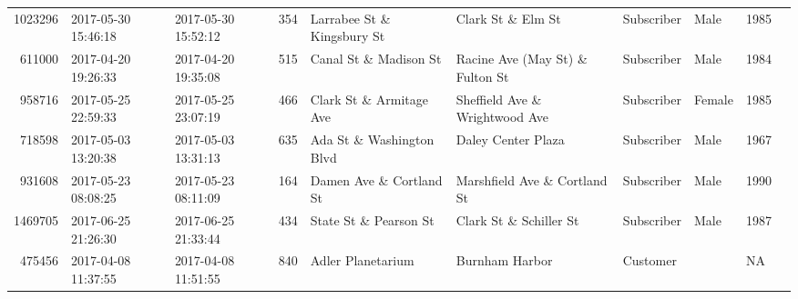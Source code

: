 \documentclass[11pt]{article}
\begin{document}
\begin{description}
\begin{tabular}{r|lllllllll}
	 1023296                                & 2017-05-30 15:46:18                    & 2017-05-30 15:52:12                    &  354                                   & Larrabee St \& Kingsbury St           & Clark St \& Elm St                    & Subscriber                             & Male                                   & 1985                                  \\
	  611000                                & 2017-04-20 19:26:33                    & 2017-04-20 19:35:08                    &  515                                   & Canal St \& Madison St                & Racine Ave (May St) \& Fulton St      & Subscriber                             & Male                                   & 1984                                  \\
	  958716                                & 2017-05-25 22:59:33                    & 2017-05-25 23:07:19                    &  466                                   & Clark St \& Armitage Ave              & Sheffield Ave \& Wrightwood Ave       & Subscriber                             & Female                                 & 1985                                  \\
	  718598                              & 2017-05-03 13:20:38                  & 2017-05-03 13:31:13                  &  635                                 & Ada St \& Washington Blvd           & Daley Center Plaza                   & Subscriber                           & Male                                 & 1967                                \\
	  931608                                & 2017-05-23 08:08:25                    & 2017-05-23 08:11:09                    &  164                                   & Damen Ave \& Cortland St              & Marshfield Ave \& Cortland St         & Subscriber                             & Male                                   & 1990                                  \\
	 1469705                                & 2017-06-25 21:26:30                    & 2017-06-25 21:33:44                    &  434                                   & State St \& Pearson St                & Clark St \& Schiller St               & Subscriber                             & Male                                   & 1987                                  \\
	  475456                              & 2017-04-08 11:37:55                  & 2017-04-08 11:51:55                  &  840                                 & Adler Planetarium                    & Burnham Harbor                       & Customer                             &                                      &   NA                                \\

\end{tabular}
\end{description}
\end{document}
